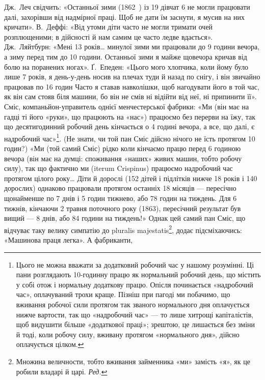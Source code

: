 Дж.~Леч свідчить: «Останньої зими (1862~) із 19 дівчат 6
не могли працювати далі, захорівши від надмірної праці. Щоб не
дати їм заснути, я мусив на них кричати». В.~Деффі: «Від утоми
діти часто не могли тримати очей розплющеними; в дійсності й
нам самим це часто ледве вдається». Дж.~Ляйтбурн: «Мені
13 років\dots{} минулої зими ми працювали до 9 години вечора, а
зиму перед тим до 10 години. Останньої зими я майже щовечора
кричав від болю на поранених ногах». Ґ.~Епеден: «Цього мого
хлопчика, коли йому було лише 7 років, я день-у-день носив
на плечах туди й назад по снігу, і він звичайно працював по
16 годин Часто я ставав навколішки, щоб нагодувати його в той
час, як він сам стояв біля машини, бо він не смів ні відійти від
неї, ні припинити її». Сміс, компаньйон-управитель однієї
менчестерської фабрики: «Ми (він має на гадці ті його «руки»,
що працюють на «нас») працюємо без перерви на їжу, так що
десятигодинний робочий день кінчається о 4  годині вечора, а
все, що далі, є надробочий час»\footnote{
Цього не можна вважати за додатковий робочий час у нашому розумінні.
Ці пани розглядають 10-годинну працю як нормальний
робочий день, що містить у собі отож і нормальну додаткову працю. Опісля
починається «надробочий час», оплачуваний трохи краще. Пізніш при
пагоді ми побачимо, що вживання робочої сили протягом так званого
нормального дня оплачується нижче вартости, так що «надробочий
час» — то лише хитрощі капіталістів, щоб видушити більше «додаткової
праці»; зрештою, це лишається без зміни й тоді, коли робочу силу, вживану
протягом «нормального дня», дійсно оплачується цілком.
}. (Не знати, чи той пан Сміс
дійсно нічого не їсть протягом  10 годин?) «Ми (той самий
Сміс) рідко коли кінчаємо працю перед 6 годиною вечора (він
має на думці: споживання «наших» живих машин, тобто робочу
силу), так що фактично ми (iterum Crispinus) працюємо надробочий
час протягом цілого року\dots{} Діти й дорослі (152 дітей і
підлітків нижче 18 років і 140 дорослих) однаково працювали
протягом останніх 18 місяців — пересічно щонайменше по 7 днів
і 5 годин тижнево, або 78 годин на тиждень. Для 6 тижнів,
кінчаючи 2 травня поточного року (1863), пересічний результат
був вищий — 8 днів, або 84 години на тиждень!» Однак  цей самий
пан Сміс, що відчуває таку велику симпатію до pluralis majestatis\footnote*{
Множина величности, тобто вживання займенника «ми» замість
«я», як це робили владарі й царі. \emph{Ред.}
},
додає підсміхаючись: «Машинова праця легка». А фабриканти,
